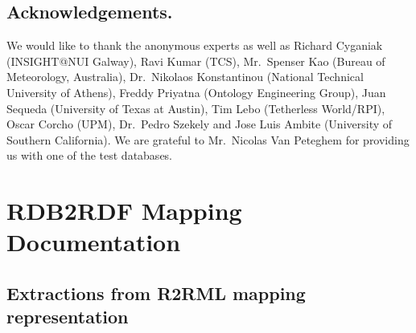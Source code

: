 \section*{Acknowledgements.}
We would like to thank the anonymous experts as well as Richard Cyganiak (INSIGHT@NUI Galway), Ravi Kumar (TCS), Mr.\ Spenser Kao (Bureau of Meteorology, Australia), Dr.\ Nikolaos Konstantinou (National Technical University of Athens), Freddy Priyatna (Ontology Engineering Group), Juan Sequeda (University of Texas at Austin), Tim Lebo (Tetherless World/RPI), Oscar Corcho (UPM), Dr.\ Pedro Szekely and Jose Luis Ambite (University of Southern California).
We are grateful to Mr.\ Nicolas Van Peteghem for providing us with one of the test databases.

\chapter{RDB2RDF Mapping Documentation}
\label{sec:app1}
\section{Extractions from R2RML mapping representation}
\label{app1:r2rml}

